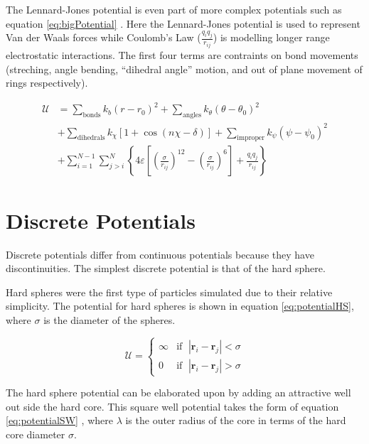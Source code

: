 \documentclass[12pt]{UoAthesis}
\begin{document}
The Lennard-Jones potential is even part of more complex potentials
such as equation \eqref{eq:bigPotential} \cite{Maginn2010}.  Here the
Lennard-Jones potential is used to represent Van der Waals forces while
Coulomb's Law ($\frac{q_iq_j}{r_{ij}}$) is modelling longer range
electrostatic interactions.  The first four terms are contraints on
bond movements (streching, angle bending, ``dihedral angle'' motion,
and out of plane movement of rings respectively).

\begin{align}
  \label{eq:bigPotential}
  \mathcal{U} &= \sum_{\text{bonds}}k_b(r-r_0)^2 
  + \sum_{\text{angles}}k_\theta(\theta - \theta_0)^2 \nonumber\\
  &+ \sum_{\text{dihedrals}} k_\chi[1+\cos(n\chi - \delta)] 
  + \sum_{\text{improper}} k_\psi(\psi - \psi_0)^2 \nonumber\\
  &+ \sum_{i=1}^{N-1}\sum_{j>i}^{N}\left\{ 4 \varepsilon 
    \left[ \left( \frac{\sigma}{r_{ij}} \right)^{12}
      -\left( \frac{\sigma}{r_{ij}} \right)^{6} \right] 
    + \frac{q_iq_j}{r_{ij}}\right\}
\end{align}

\section{Discrete Potentials}

Discrete potentials differ from continuous potentials because they
have discontinuities.  The simplest discrete potential is that of the
hard sphere.

Hard spheres were the first type of particles simulated
\cite{Alder1957} due to their relative simplicity.  The potential for
hard spheres is shown in equation \eqref{eq:potentialHS}, where $\sigma$
is the diameter of the spheres.

\begin{equation}
  \label{eq:potentialHS}
  \mathcal{U} = 
  \begin{cases}
    \infty &\text{if }\; |\mathbf{r}_i - \mathbf{r}_j| < \sigma \\
    0 &\text{if }\; |\mathbf{r}_i - \mathbf{r}_j| > \sigma
  \end{cases}
\end{equation}

The hard sphere potential can be elaborated upon by adding an
attractive well out side the hard core.  This square well potential
takes the form of equation \eqref{eq:potentialSW} \cite{Barker1967},
where $\lambda$ is the outer radius of the core in terms of the hard
core diameter $\sigma$.
\end{document}
